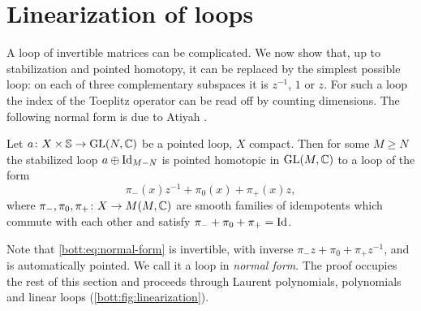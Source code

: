\section{Linearization of loops}\label{bott:sec:linearization}

A loop of invertible matrices can be complicated. We now show that, up to
stabilization and pointed homotopy, it can be replaced by the simplest possible
loop: on each of three complementary subspaces it is $z^{-1}$, $1$ or $z$. For
such a loop the index of the Toeplitz operator can be read off by counting
dimensions. The following normal form is due to Atiyah \cite{Atiyah-K}.

\begin{theorem}\label{bott:thm:linearization}
  Let $a\colon X\times\mathbb{S}\to\operatorname{GL}(N,\mathbb{C})$ be a pointed loop, $X$ compact. Then for
  some $M\ge N$ the stabilized loop $a\oplus\operatorname{Id}_{M-N}$ is pointed homotopic in
  $\operatorname{GL}(M,\mathbb{C})$ to a loop of the form
  \begin{equation}\label{bott:eq:normal-form}
    \pi_-(x)z^{-1}+\pi_0(x)+\pi_+(x)z,
  \end{equation}
  where $\pi_-,\pi_0,\pi_+\colon X\to M(M,\mathbb{C})$ are smooth families of idempotents
  which commute with each other and satisfy $\pi_-+\pi_0+\pi_+=\operatorname{Id}$.
\end{theorem}

Note that \eqref{bott:eq:normal-form} is invertible, with inverse
$\pi_-z+\pi_0+\pi_+z^{-1}$, and is automatically pointed. We call it a loop in
\emph{normal form}. The proof occupies the rest of this section and proceeds through
Laurent polynomials, polynomials and linear loops (\cref{bott:fig:linearization}).


